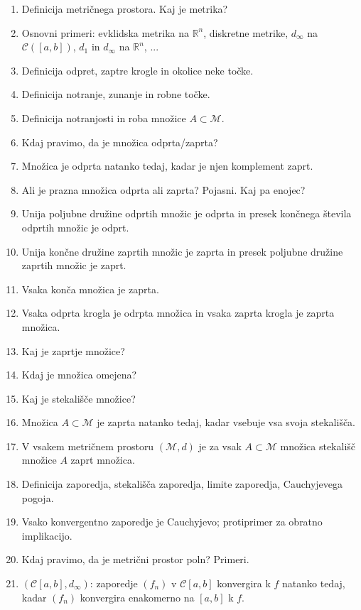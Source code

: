 \documentclass[a4paper,12pt]{report}
\begin{document}
\begin{enumerate}
    \item Definicija metričnega prostora. Kaj je metrika?
    \item Osnovni primeri: evklidska metrika na $\mathbb{R}^n$, diskretne metrike, $d_{\infty}$ na $\mathcal{C}([a, b])$, $d_1$ in $d_{\infty}$ na $\mathbb{R}^n$, ...
    \item Definicija odpret, zaptre krogle in okolice neke točke.
    \item Definicija notranje, zunanje in robne točke.
    \item Definicija notranjosti in roba množice $A \subset \mathcal{M}$.
    \item Kdaj pravimo, da je množica odprta/zaprta?
    \item Množica je odprta natanko tedaj, kadar je njen komplement zaprt.
    \item Ali je prazna množica odprta ali zaprta? Pojasni. Kaj pa enojec?
    \item Unija poljubne družine odprtih množic je odprta in presek končnega števila odprtih množic je odprt.
    \item Unija končne družine zaprtih množic je zaprta in presek poljubne družine zaprtih množic je zaprt.
    \item Vsaka konča množica je zaprta.
    \item Vsaka odprta krogla je odrpta množica in vsaka zaprta krogla je zaprta množica.
    \item Kaj je zaprtje množice?
    \item Kdaj je množica omejena?
    \item Kaj je stekališče množice?
    \item Množica $A \subset \mathcal{M}$ je zaprta natanko tedaj, kadar vsebuje vsa svoja stekališča.
    \item V vsakem metričnem prostoru $(\mathcal{M}, d)$ je za vsak $A \subset \mathcal{M}$ množica stekališč množice $A$ zaprt množica.
    \item Definicija zaporedja, stekališča zaporedja, limite zaporedja, Cauchyjevega pogoja.
    \item Vsako konvergentno zaporedje je Cauchyjevo; protiprimer za obratno implikacijo.
    \item Kdaj pravimo, da je metrični prostor poln? Primeri.
    \item $(\mathcal{C}[a, b], d_{\infty})$: zaporedje $(f_n)$ v $\mathcal{C}[a, b]$ konvergira k $f$ natanko tedaj, kadar $(f_n)$ konvergira enakomerno na $[a, b]$ k $f$.

\end{enumerate}
\end{document}
